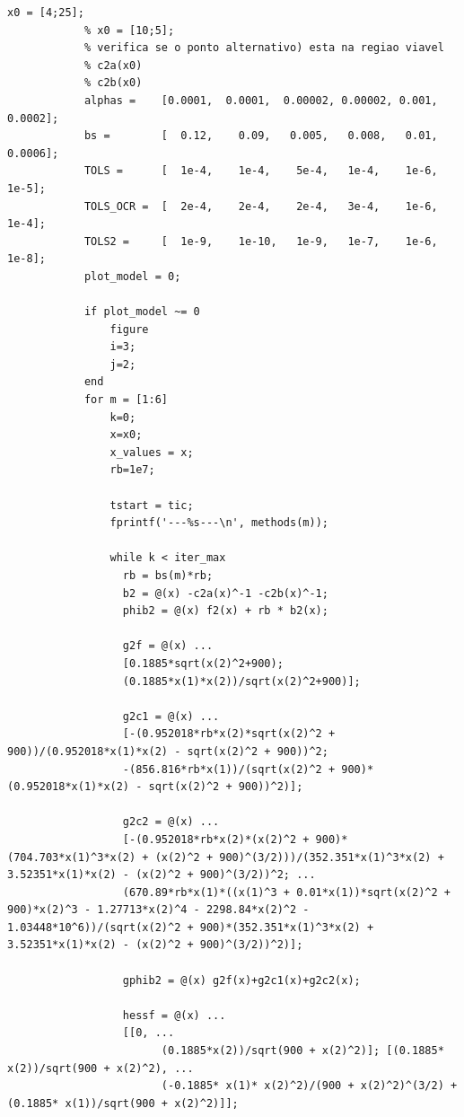 \documentclass[10pt, a4paper]{article}
\begin{document}
\begin{minipage}{\linewidth}
      \begin{lstlisting}[style=myStyle, caption= trecho de c\'odigo do problema 02 (barreira) (1/2), label=list_p02_bar_1]
            x0 = [4;25];
            % x0 = [10;5];
            % verifica se o ponto alternativo) esta na regiao viavel
            % c2a(x0)
            % c2b(x0)
            alphas =    [0.0001,  0.0001,  0.00002, 0.00002, 0.001,   0.0002];
            bs =        [  0.12,    0.09,   0.005,   0.008,   0.01,   0.0006];
            TOLS =      [  1e-4,    1e-4,    5e-4,   1e-4,    1e-6,    1e-5];
            TOLS_OCR =  [  2e-4,    2e-4,    2e-4,   3e-4,    1e-6,    1e-4];
            TOLS2 =     [  1e-9,    1e-10,   1e-9,   1e-7,    1e-6,    1e-8];
            plot_model = 0;

            if plot_model ~= 0
                figure
                i=3;
                j=2;
            end
            for m = [1:6]
                k=0;
                x=x0;
                x_values = x;
                rb=1e7;

                tstart = tic;
                fprintf('---%s---\n', methods(m));

                while k < iter_max
                  rb = bs(m)*rb;
                  b2 = @(x) -c2a(x)^-1 -c2b(x)^-1;
                  phib2 = @(x) f2(x) + rb * b2(x);

                  g2f = @(x) ...
                  [0.1885*sqrt(x(2)^2+900);
                  (0.1885*x(1)*x(2))/sqrt(x(2)^2+900)];

                  g2c1 = @(x) ...
                  [-(0.952018*rb*x(2)*sqrt(x(2)^2 + 900))/(0.952018*x(1)*x(2) - sqrt(x(2)^2 + 900))^2;
                  -(856.816*rb*x(1))/(sqrt(x(2)^2 + 900)*(0.952018*x(1)*x(2) - sqrt(x(2)^2 + 900))^2)];

                  g2c2 = @(x) ...
                  [-(0.952018*rb*x(2)*(x(2)^2 + 900)*(704.703*x(1)^3*x(2) + (x(2)^2 + 900)^(3/2)))/(352.351*x(1)^3*x(2) + 3.52351*x(1)*x(2) - (x(2)^2 + 900)^(3/2))^2; ...
                  (670.89*rb*x(1)*((x(1)^3 + 0.01*x(1))*sqrt(x(2)^2 + 900)*x(2)^3 - 1.27713*x(2)^4 - 2298.84*x(2)^2 - 1.03448*10^6))/(sqrt(x(2)^2 + 900)*(352.351*x(1)^3*x(2) + 3.52351*x(1)*x(2) - (x(2)^2 + 900)^(3/2))^2)];

                  gphib2 = @(x) g2f(x)+g2c1(x)+g2c2(x);

                  hessf = @(x) ...
                  [[0, ...
                        (0.1885*x(2))/sqrt(900 + x(2)^2)]; [(0.1885* x(2))/sqrt(900 + x(2)^2), ...
                        (-0.1885* x(1)* x(2)^2)/(900 + x(2)^2)^(3/2) + (0.1885* x(1))/sqrt(900 + x(2)^2)]];


\end{lstlisting}
\end{minipage}
\end{document}
